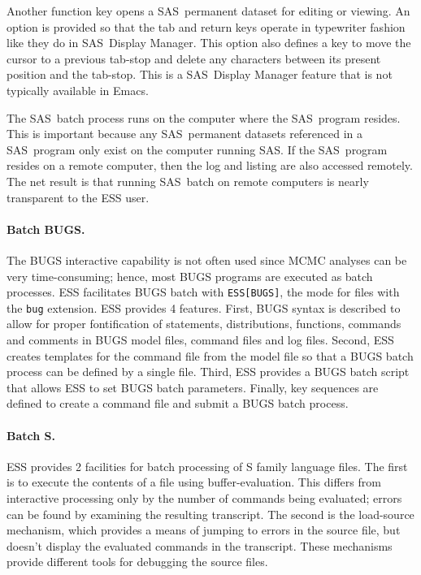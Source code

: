 \documentclass{article}
\newcommand*{\SAS}{\textsc{SAS}}
\newcommand{\stexttt}[1]{{\small\texttt{#1}}}
\begin{document}
Another function key opens a \SAS\ permanent dataset for editing or
viewing.  An option is provided so that the tab and return keys
operate in typewriter fashion like they do in \SAS\ Display Manager.
This option also defines a key to move the cursor to a previous
tab-stop and delete any characters between its present position and
the tab-stop.  This is a \SAS\ Display Manager feature that is not
typically available in Emacs.

The \SAS\ batch process runs on the computer where the \SAS\ program
resides.  This is important because any \SAS\ permanent datasets
referenced in a \SAS\ program only exist on the computer running \SAS.
If the \SAS\ program resides on a remote computer, then the log and
listing are also accessed remotely.  The net result is that running
\SAS\ batch on remote computers is nearly transparent to the ESS user.

\paragraph{Batch BUGS.}
The BUGS interactive capability is not often used since MCMC analyses
can be very time-consuming; hence, most BUGS programs are executed as
batch processes.  ESS facilitates BUGS batch with \stexttt{ESS[BUGS]},
the mode for files with the \stexttt{bug} extension.  ESS provides 4
features.  First, BUGS syntax is described to allow for proper
fontification of statements, distributions, functions, commands and
comments in BUGS model files, command files and log files.  Second,
ESS creates templates for the command file from the model file so that
a BUGS batch process can be defined by a single file.  Third, ESS
provides a BUGS batch script that allows ESS to set BUGS batch
parameters.  Finally, key sequences are defined to create a command
file and submit a BUGS batch process.

\paragraph{Batch S.}
ESS provides 2 facilities for batch processing of S family language
files.  The first is to execute the contents of a file using
buffer-evaluation.  This differs from interactive processing only by
the number of commands being evaluated; errors can be found by
examining the resulting transcript.  The second is the load-source
mechanism, which provides a means of jumping to errors in the source
file, but doesn't display the evaluated commands in the transcript.
These mechanisms provide different tools for debugging the source
files.
\end{document}
